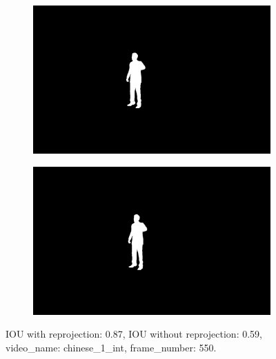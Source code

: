 \begin{figure}
\begin{subfigure}[t]{0.19\textwidth}
\end{subfigure}
\begin{subfigure}[t]{0.19\textwidth}
\centering
\includegraphics[scale=0.07]{good_examples/visual_69756_w_np.png}
\end{subfigure}
\begin{subfigure}[t]{0.19\textwidth}
\centering
\includegraphics[scale=0.07]{good_examples/visual_69756_wo_np.png}
\end{subfigure}
\caption{IOU with reprojection: 0.87, IOU without reprojection: 0.59, video\_name: chinese\_1\_int, frame\_number: 550.}
\end{figure}

